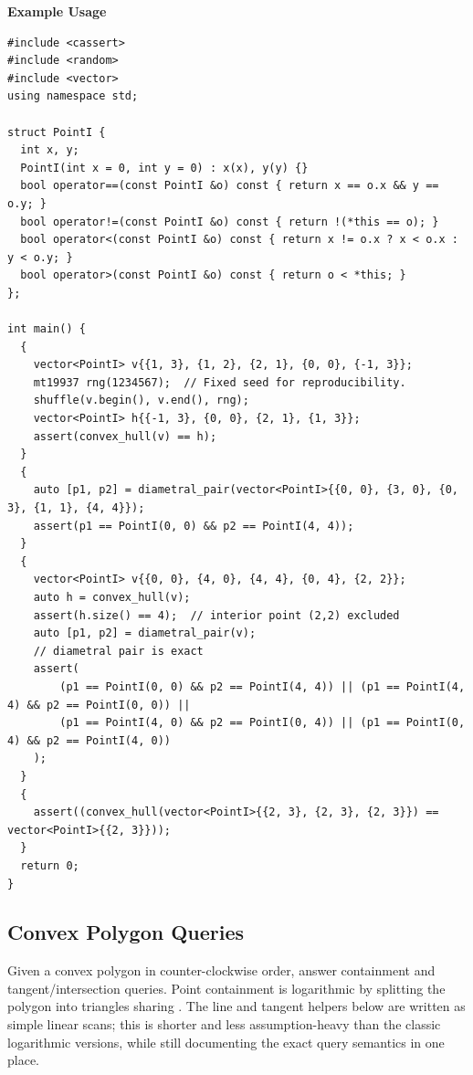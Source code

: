 \textbf{Example Usage}\par
\begin{lstlisting}[style=cpp]
#include <cassert>
#include <random>
#include <vector>
using namespace std;

struct PointI {
  int x, y;
  PointI(int x = 0, int y = 0) : x(x), y(y) {}
  bool operator==(const PointI &o) const { return x == o.x && y == o.y; }
  bool operator!=(const PointI &o) const { return !(*this == o); }
  bool operator<(const PointI &o) const { return x != o.x ? x < o.x : y < o.y; }
  bool operator>(const PointI &o) const { return o < *this; }
};

int main() {
  {
    vector<PointI> v{{1, 3}, {1, 2}, {2, 1}, {0, 0}, {-1, 3}};
    mt19937 rng(1234567);  // Fixed seed for reproducibility.
    shuffle(v.begin(), v.end(), rng);
    vector<PointI> h{{-1, 3}, {0, 0}, {2, 1}, {1, 3}};
    assert(convex_hull(v) == h);
  }
  {
    auto [p1, p2] = diametral_pair(vector<PointI>{{0, 0}, {3, 0}, {0, 3}, {1, 1}, {4, 4}});
    assert(p1 == PointI(0, 0) && p2 == PointI(4, 4));
  }
  {
    vector<PointI> v{{0, 0}, {4, 0}, {4, 4}, {0, 4}, {2, 2}};
    auto h = convex_hull(v);
    assert(h.size() == 4);  // interior point (2,2) excluded
    auto [p1, p2] = diametral_pair(v);
    // diametral pair is exact
    assert(
        (p1 == PointI(0, 0) && p2 == PointI(4, 4)) || (p1 == PointI(4, 4) && p2 == PointI(0, 0)) ||
        (p1 == PointI(4, 0) && p2 == PointI(0, 4)) || (p1 == PointI(0, 4) && p2 == PointI(4, 0))
    );
  }
  {
    assert((convex_hull(vector<PointI>{{2, 3}, {2, 3}, {2, 3}}) == vector<PointI>{{2, 3}}));
  }
  return 0;
}
\end{lstlisting}
\subsection{Convex Polygon Queries}
\label{sec:7.3.4}
Given a convex polygon in counter-clockwise order, answer containment and tangent/intersection queries. Point containment is logarithmic by splitting the polygon into triangles sharing . The line and tangent helpers below are written as simple linear scans; this is shorter and less assumption-heavy than the classic logarithmic versions, while still documenting the exact query semantics in one place.

